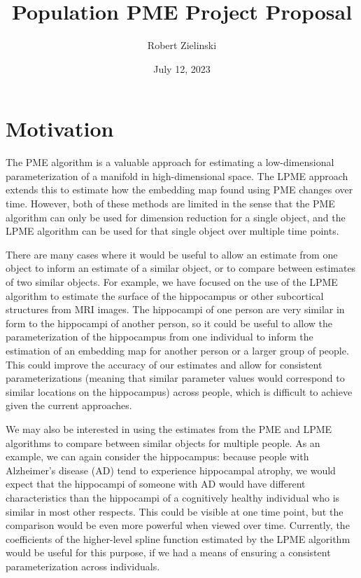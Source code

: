 \documentclass[11pt, reqno]{article}
\title{Population PME Project Proposal}
\author{Robert Zielinski}
\date{July 12, 2023}
\begin{document}
\maketitle

\section{Motivation}

The PME algorithm is a valuable approach for estimating a low-dimensional parameterization of a manifold in high-dimensional space. The LPME approach extends this to estimate how the embedding map found using PME changes over time. However, both of these methods are limited in the sense that the PME algorithm can only be used for dimension reduction for a single object, and the LPME algorithm can be used for that single object over multiple time points.

There are many cases where it would be useful to allow an estimate from one object to inform an estimate of a similar object, or to compare between estimates of two similar objects. For example, we have focused on the use of the LPME algorithm to estimate the surface of the hippocampus or other subcortical structures from MRI images. The hippocampi of one person are very similar in form to the hippocampi of another person, so it could be useful to allow the parameterization of the hippocampus from one individual to inform the estimation of an embedding map for another person or a larger group of people. This could improve the accuracy of our estimates and allow for consistent parameterizations (meaning that similar parameter values would correspond to similar locations on the hippocampus) across people, which is difficult to achieve given the current approaches.

We may also be interested in using the estimates from the PME and LPME algorithms to compare between similar objects for multiple people. As an example, we can again consider the hippocampus: because people with Alzheimer's disease (AD) tend to experience hippocampal atrophy, we would expect that the hippocampi of someone with AD would have different characteristics than the hippocampi of a cognitively healthy individual who is similar in most other respects. This could be visible at one time point, but the comparison would be even more powerful when viewed over time. Currently, the coefficients of the higher-level spline function estimated by the LPME algorithm would be useful for this purpose, if we had a means of ensuring a consistent parameterization across individuals. 
\end{document}
